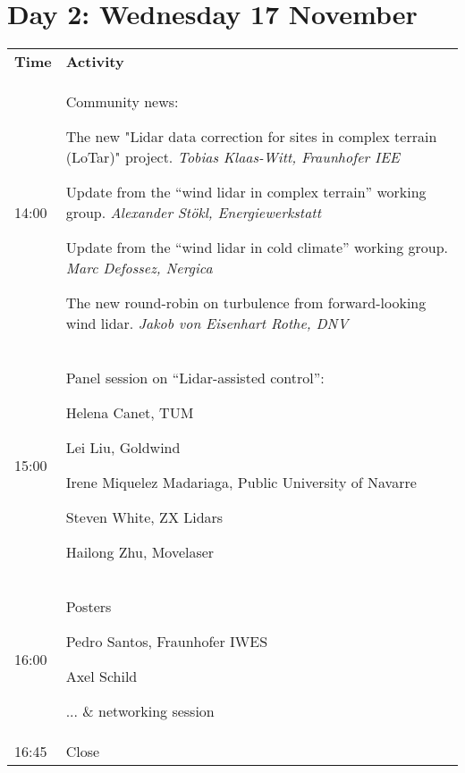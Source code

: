 \section{Day 2: Wednesday 17 November}

\bgroup
\begin{table}[!h]
    \centering
    \begin{tabular}{@{}
        |p{}
        |p{}
        |@{}}
    \rowcolor{Task32Blue2} \textbf{Time} & \textbf{Activity} \\
    14:00 & Community news: 
        \begin{tableitemize}
            \item The new "Lidar data correction for sites in complex terrain (LoTar)" project. \textit{Tobias Klaas-Witt, Fraunhofer IEE}
            \item Update from the “wind lidar in complex terrain” working group. \textit{Alexander Stökl, Energiewerkstatt}
            \item Update from the “wind lidar in cold climate” working group. \textit{Marc Defossez, Nergica}
            \item The new round-robin on turbulence from forward-looking wind lidar. \textit{Jakob von Eisenhart Rothe, DNV}
        \end{tableitemize}\\
    15:00 & Panel session on “Lidar-assisted control”:
        \begin{tableitemize}
            \item Helena Canet, TUM
            \item Lei Liu, Goldwind
            \item Irene Miquelez Madariaga, Public University of Navarre
            \item Steven White, ZX Lidars
            \item Hailong Zhu, Movelaser
        \end{tableitemize} \\
    16:00 & Posters\par
    \begin{tableitemize}
            \item Pedro Santos, Fraunhofer IWES
            \item Axel Schild
        \end{tableitemize} \par
        ... \& networking session \\
    16:45 & Close
    \end{tabular}
    \label{tab:day2-agenda}
\end{table}
\egroup